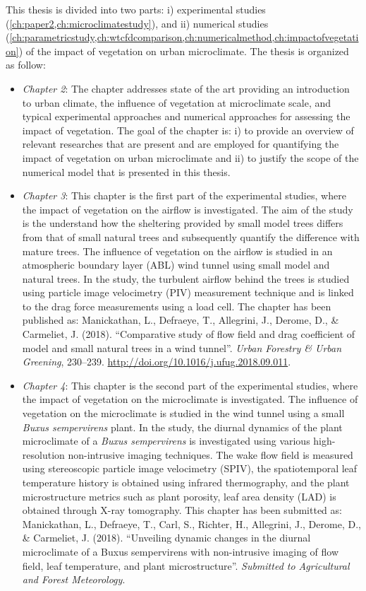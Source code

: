 This thesis is divided into two parts: i) experimental studies (\cref{ch:paper2,ch:microclimatestudy}), and ii) numerical studies (\cref{ch:parametricstudy,ch:wtcfdcomparison,ch:numericalmethod,ch:impactofvegetation}) of the impact of vegetation on urban microclimate. The thesis is organized as follow:
\begin{itemize}
	\item \textit{Chapter 2}: The chapter addresses state of the art providing an introduction to urban climate, the influence of vegetation at microclimate scale, and typical experimental approaches and numerical approaches for assessing the impact of vegetation. The goal of the chapter is: i) to provide an overview of relevant researches that are present and are employed for quantifying the impact of vegetation on urban microclimate and ii) to justify the scope of the numerical model that is presented in this thesis. 

	\item \textit{Chapter 3}: This chapter is the first part of the experimental studies, where the impact of vegetation on the airflow is investigated. The aim of the study is the understand how the sheltering provided by small model trees differs from that of small natural trees and subsequently quantify the difference with mature trees. The influence of vegetation on the airflow is studied in an atmospheric boundary layer (ABL) wind tunnel using small model and natural trees. In the study, the turbulent airflow behind the trees is studied using particle image velocimetry (PIV) measurement technique and is linked to the drag force measurements using a load cell. The chapter has been published as: Manickathan, L., Defraeye, T., Allegrini, J., Derome, D., \& Carmeliet, J. (2018). ``Comparative study of flow field and drag coefficient of model and small natural trees in a wind tunnel''. \textit{Urban Forestry \& Urban Greening}, 230–239. \url{http://doi.org/10.1016/j.ufug.2018.09.011}.	

	\item \textit{Chapter 4}: This chapter is the second part of the experimental studies, where the impact of vegetation on the microclimate is investigated. The influence of vegetation on the microclimate is studied in the wind tunnel using a small \textit{Buxus sempervirens} plant. In the study, the diurnal dynamics of the plant microclimate of a \textit{Buxus sempervirens} is investigated using various high-resolution non-intrusive imaging techniques. The wake flow field is measured using stereoscopic particle image velocimetry (SPIV), the spatiotemporal leaf temperature history is obtained using infrared thermography, and the plant microstructure metrics such as plant porosity, leaf area density (LAD) is obtained through X-ray tomography. This chapter has been submitted as: Manickathan, L., Defraeye, T., Carl, S., Richter, H., Allegrini, J., Derome, D., \& Carmeliet, J. (2018). ``Unveiling dynamic changes in the diurnal microclimate of a Buxus sempervirens with non-intrusive imaging of flow field, leaf temperature, and plant microstructure''. \textit{Submitted to Agricultural and Forest Meteorology}.


\end{itemize}
